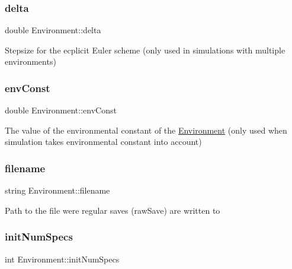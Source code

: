 \subsubsection{\texorpdfstring{delta}{delta}}
{\footnotesize\ttfamily double Environment\+::delta\hspace{0.3cm}{\ttfamily [protected]}}

Stepsize for the ecplicit Euler scheme (only used in simulations with multiple environments) \mbox{\label{classEnvironment_a664313c95d2a9afc397ab4bf6f4f1457}} 
\subsubsection{\texorpdfstring{env\+Const}{envConst}}
{\footnotesize\ttfamily double Environment\+::env\+Const\hspace{0.3cm}{\ttfamily [protected]}}

The value of the environmental constant of the \hyperlink{classEnvironment}{Environment} (only used when simulation takes environmental constant into account) \mbox{\label{classEnvironment_afefeccf87332c116006372e3ee197452}} 
\subsubsection{\texorpdfstring{filename}{filename}}
{\footnotesize\ttfamily string Environment\+::filename\hspace{0.3cm}{\ttfamily [protected]}}

Path to the file were regular saves (raw\+Save) are written to \mbox{\label{classEnvironment_a5c1c5043ec7885eb05d88590f405c02b}} 
\subsubsection{\texorpdfstring{init\+Num\+Specs}{initNumSpecs}}
{\footnotesize\ttfamily int Environment\+::init\+Num\+Specs\hspace{0.3cm}{\ttfamily [protected]}}

